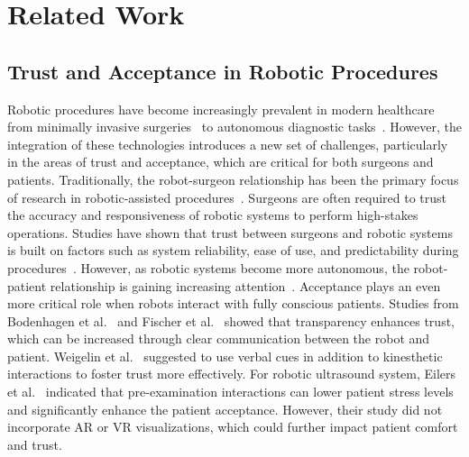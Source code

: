 \section{Related Work}
\label{sec:RelatedWork}

\subsection{Trust and Acceptance in Robotic Procedures}

Robotic procedures have become increasingly prevalent in modern healthcare from minimally invasive surgeries~\cite{mack2001minimally,vitiello2012emerging} to autonomous diagnostic tasks~\cite{roshan2022robotic,jiang2023robotic}. However, the integration of these technologies introduces a new set of challenges, particularly in the areas of trust and acceptance, which are critical for both surgeons and patients.
Traditionally, the robot-surgeon relationship has been the primary focus of research in robotic-assisted procedures~\cite{mcdermott2020gender,sierra2021expectations,vichitkraivin2021factors}. Surgeons are often required to trust the accuracy and responsiveness of robotic systems to perform high-stakes operations. Studies have shown that trust between surgeons and robotic systems is built on factors such as system reliability, ease of use, and predictability during procedures~\cite{devito2010clinical,benmessaoud2011facilitators,chatterjee2024advancements,patel2024technical}. However, as robotic systems become more autonomous, the robot-patient relationship is gaining increasing attention~\cite{szabo2024robots}. Acceptance plays an even more critical role when robots interact with fully conscious patients. Studies from Bodenhagen et al.~\cite{bodenhagen2017influence} and Fischer et al.~\cite{fischer2018increasing} showed that transparency enhances trust, which can be increased through clear communication between the robot and patient. Weigelin et al.~\cite{weigelin2018trust} suggested to use verbal cues in addition to kinesthetic interactions to foster trust more effectively. For robotic ultrasound system, Eilers et al.~\cite{eilers2023importance} indicated that pre-examination interactions can lower patient stress levels and significantly enhance the patient acceptance. However, their study did not incorporate AR or VR visualizations, which could further impact patient comfort and trust. 

